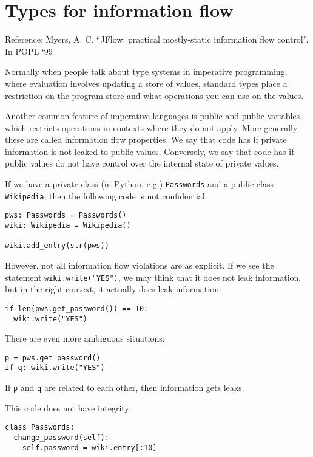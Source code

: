 \documentclass[class=scrartcl]{standalone}
\begin{document}

\section{Types for information flow}
Reference: Myers, A. C. ``JFlow: practical mostly-static information flow control''. In POPL `99

Normally when people talk about type systems in imperative programming,
where evaluation involves updating a store of values,
standard types place a restriction on the program store
and what operations you can use on the values.

Another common feature of imperative languages is public and public variables,
which restricts operations in contexts where they do not apply.
More generally, these are called information flow properties.
We say that code has  if private information
is not leaked to public values.
Conversely, we say that code has 
if public values do not have control over
the internal state of private values.

\begin{example}[Confidentiality]
  If we have a private class (in Python, e.g.) \texttt{Passwords}
  and a public class \texttt{Wikipedia},
  then the following code is not confidential:
  \begin{verbatim}
pws: Passwords = Passwords()
wiki: Wikipedia = Wikipedia()

wiki.add_entry(str(pws))
  \end{verbatim}
  However, not all information flow violations are as explicit.
  If we see the statement \texttt{wiki.write("YES")},
  we may think that it does not leak information,
  but in the right context, it actually does leak information:
  \begin{verbatim}
if len(pws.get_password()) == 10:
  wiki.write("YES")
  \end{verbatim}
  There are even more ambiguous situations:
  \begin{verbatim}
p = pws.get_password()
if q: wiki.write("YES")
  \end{verbatim}
  If \texttt{p} and \texttt{q} are
  related to each other, then information gets leaks.
\end{example}

\begin{example}[Integrity]
  This code does not have integrity:
  \begin{verbatim}
class Passwords:
  change_password(self):
    self.password = wiki.entry[:10]
  \end{verbatim}
\end{example}
\end{document}
